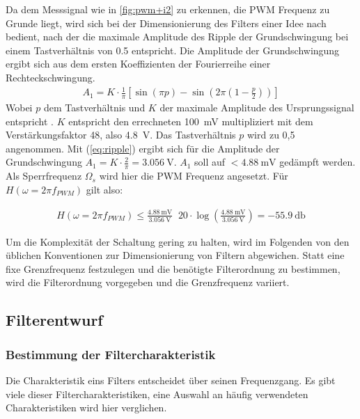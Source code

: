 Da dem Messsignal wie in \cref{fig:pwm+i2} zu erkennen, die PWM Frequenz zu Grunde liegt, wird sich bei der Dimensionierung des Filters einer Idee nach \cite{Alter2008} bedient, nach der die maximale Amplitude des Ripple der Grundschwingung bei einem
Tastverhältnis von \num{0,5} ent\-spricht. Die Amplitude der Grundschwingung ergibt sich aus dem ersten Koeffizienten der Fourierreihe einer Rechteckschwingung.
\begin{align}
A_1 = K\cdot \frac{1}{\pi}[\sin(\pi p)-\sin(2\pi(1-\frac{p}{2}))]
\label{eq:ripple}
\end{align}
Wobei $p$ dem Tastverhältnis und $K$ der maximale Amplitude des Ursprungssignal entspricht \cite{Alter2008}. $K$ entspricht den errechneten \SI{100}{\milli\volt} multipliziert mit dem Verstärkungsfaktor 48, also \SI{4,8}{\volt}. 
Das Tastverhältnis $p$ wird zu 0,5
angenommen. Mit (\ref{eq:ripple}) ergibt sich für die Amplitude der Grundschwingung $ A_1 = K\cdot \frac{2}{\pi} = \SI{3,056}{\volt}$. $A_1$ soll auf $ < \SI{4,88}{\milli\volt}$ gedämpft werden.
Als Sperrfrequenz $\Omega_s $ wird hier die PWM Frequenz angesetzt. Für $H(\omega=2\pi f_{PWM})$ gilt also:

\begin{align}
H(\omega=2\pi f_{PWM}) \le \frac{\SI{4,88}{\milli\volt}}{\SI{3,056}{\volt}} \mathop{\hat{=}} 20\cdot\log(\frac{\SI{4,88}{\milli\volt}}{\SI{3,056}{\volt}})= \SI{-55,9}{\decibel}
\label{eq:daempfung}
\end{align}

Um die Komplexität der Schaltung gering zu halten, wird im Folgenden von den üblichen Konventionen zur Dimensionierung von Filtern abgewichen.
Statt eine fixe Grenzfrequenz festzulegen und die benötigte Filterordnung zu bestimmen, wird die Filterordnung vorgegeben und die Grenzfrequenz variiert.

\subsection{Filterentwurf}

\subsubsection{Bestimmung der Filtercharakteristik}

Die Charakteristik eins Filters entscheidet über seinen Frequenzgang. Es gibt viele dieser Filtercharakteristiken, eine Auswahl an häufig verwendeten Charakteristiken wird hier verglichen.

